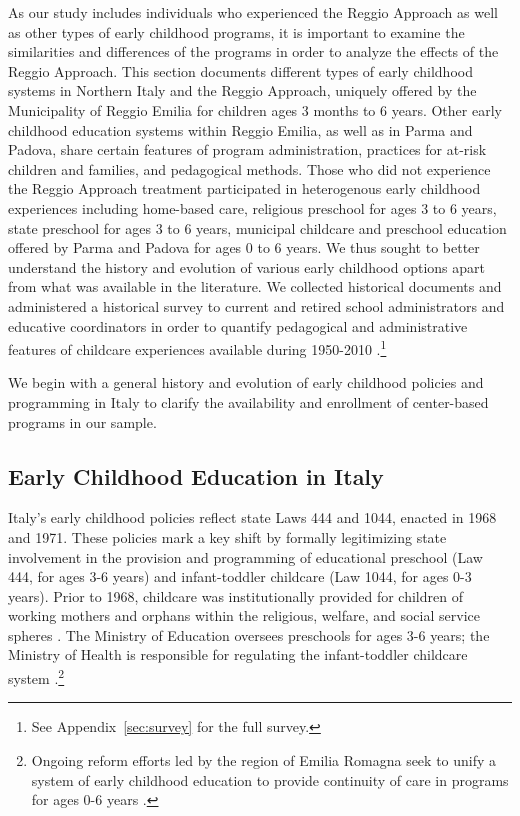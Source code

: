 
As our study includes individuals who experienced the Reggio Approach as well as other types of early childhood programs, it is important to examine the similarities and differences of the programs in order to analyze the effects of the Reggio Approach. This section documents different types of early childhood systems in Northern Italy and the Reggio Approach, uniquely offered by the Municipality of Reggio Emilia for children ages 3 months to 6 years. Other early childhood education systems within Reggio Emilia, as well as in Parma and Padova, share certain features of program administration, practices for at-risk children and families, and pedagogical methods. Those who did not experience the Reggio Approach treatment participated in heterogenous early childhood experiences including home-based care, religious preschool for ages 3 to 6 years, state preschool for ages 3 to 6 years, municipal childcare and preschool education offered by Parma and Padova for ages 0 to 6 years. We thus sought to better understand the history and evolution of various early childhood options apart from what was available in the literature. We collected historical documents \citep{Padova-Admin-Data_1964-2011,Reggio-Admin-data_1966-2006,Reggio-Annual-Journals_1994-2011} and administered a historical survey to current and retired school administrators and educative coordinators in order to quantify pedagogical and administrative features of childcare experiences available during 1950-2010 \citep{CEHD_2016_Historical-Analysis}.\footnote{See Appendix~\ref{sec:survey} for the full survey.} 

We begin with a general history and evolution of early childhood policies and programming in Italy to clarify the availability and enrollment of center-based programs in our sample.

\subsection{Early Childhood Education in Italy}

Italy's early childhood policies reflect state Laws 444 and 1044, enacted in 1968 and 1971. These policies mark a key shift by formally legitimizing state involvement in the provision and programming of educational preschool (Law 444, for ages 3-6 years) and infant-toddler childcare (Law 1044, for ages 0-3 years). Prior to 1968, childcare was institutionally provided for children of working mothers and orphans within the religious, welfare, and social service spheres \citep{OECD_2001_Italy-Country-Note,Hohnerlein_2015_Development-and-Diffusion}. The Ministry of Education oversees preschools for ages 3-6 years; the Ministry of Health is responsible for regulating the infant-toddler childcare system \citep{Corsaro_1996_Early-Edu}.\footnote{Ongoing reform efforts led by the region of Emilia Romagna seek to unify a system of early childhood education to provide continuity of care in programs for ages 0-6 years \citep{CEHD_2016_Historical-Analysis}.} 

